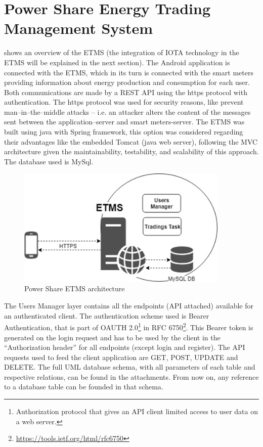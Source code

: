 \section{Power Share Energy Trading Management System}\label{psetms}


 shows an overview of the ETMS (the integration of IOTA technology in the ETMS will be explained in the next section). The Android application is connected with the ETMS, which in its turn is connected with the smart meters providing information about energy production and consumption for each user. Both communications are made by a REST API using the https protocol with authentication. The https protocol was used for security reasons, like prevent man--in--the--middle attacks -- i.e. an attacker alters the content of the messages sent between the application--server and smart meters-server.
The ETMS was built using java with Spring framework, this option was considered regarding their advantages like the embedded Tomcat (java web server), following the \ac{MVC} architecture given the maintainability, testability, and scalability of this approach. The database used is MySql.


\begin{figure}[h]
\centering
\includegraphics[width=0.9\textwidth]{./Images/ps12}
\caption{Power Share \ac{ETMS} architecture}
\label{fig:ps12}
\end{figure}

The Users Manager layer contains all the endpoints (\ac{API} attached) available for an authenticated client. The authentication scheme used is Bearer Authentication, that is part of OAUTH 2.0\footnote{Authorization protocol that gives an \ac{API} client limited access to user data on a web server.} in RFC 6750\footnote{\url{https://tools.ietf.org/html/rfc6750}}. This Bearer token is generated on the login request and has to be used by the client in the “Authorization header” for all endpoints (except login and register). The API requests used to feed the client application are GET, POST, UPDATE and DELETE. The full \ac{UML} database schema, with all parameters of each table and respective relations, can be found in the attachments. From now on, any reference to a database table can be founded in that schema. 


